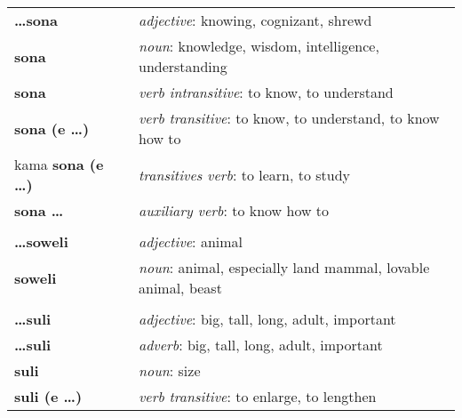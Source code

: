 \begin{supertabular}{p{2,5cm}|ll}
    \textbf{\dots sona}          &  & \textit{adjective}: knowing, cognizant, shrewd                                                             \\
    \textbf{sona}                &  & \textit{noun}: knowledge, wisdom, intelligence, understanding                                              \\
    \textbf{sona}                &  & \textit{verb intransitive}: to know, to understand                                                         \\
    \textbf{sona (e \dots)}      &  & \textit{verb transitive}: to know, to understand, to know how to                                           \\
    kama \textbf{sona (e \dots)} &  & \textit{transitives verb}: to learn, to study                                                              \\
    \textbf{sona \dots}          &  & \textit{auxiliary verb}: to know how to                                                                    \\
                                 &  &                                                                                                            \\
    \textbf{\dots soweli}        &  & \textit{adjective}: animal                                                                                 \\
    \textbf{soweli}              &  & \textit{noun}: animal, especially land mammal, lovable animal, beast                                       \\
                                 &  &                                                                                                            \\
    \textbf{\dots suli}          &  & \textit{adjective}: big, tall, long, adult, important                                                      \\
    \textbf{\dots suli}          &  & \textit{adverb}: big, tall, long, adult, important                                                         \\
    \textbf{suli}                &  & \textit{noun}: size                                                                                        \\
    \textbf{suli (e \dots)}      &  & \textit{verb transitive}: to enlarge, to lengthen                                                          \\

\end{supertabular}
